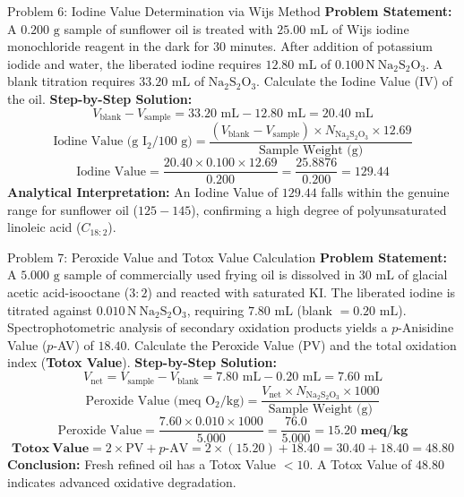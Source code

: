 \documentclass[11pt,a4paper,oneside]{article}
\begin{document}
\begin{examplebox}{Problem 6: Iodine Value Determination via Wijs Method}
\textbf{Problem Statement:}
A $0.200\text{ g}$ sample of sunflower oil is treated with $25.00\text{ mL}$ of Wijs iodine monochloride reagent in the dark for 30 minutes. After addition of potassium iodide and water, the liberated iodine requires $12.80\text{ mL}$ of $0.100\,\mathrm{N}\ \mathrm{Na_2S_2O_3}$. A blank titration requires $33.20\text{ mL}$ of $\mathrm{Na_2S_2O_3}$.
Calculate the Iodine Value (IV) of the oil.
\vspace{0.2cm}
\textbf{Step-by-Step Solution:}
$$V_{\text{blank}} - V_{\text{sample}} = 33.20\text{ mL} - 12.80\text{ mL} = 20.40\text{ mL}$$
$$\text{Iodine Value (g }\mathrm{I_2}\text{/100 g)} = \frac{(V_{\text{blank}} - V_{\text{sample}}) \times N_{\mathrm{Na_2S_2O_3}} \times 12.69}{\text{Sample Weight (g)}}$$
$$\text{Iodine Value} = \frac{20.40 \times 0.100 \times 12.69}{0.200} = \frac{25.8876}{0.200} = \mathbf{129.44}$$
\textbf{Analytical Interpretation:} An Iodine Value of $129.44$ falls within the genuine range for sunflower oil ($125-145$), confirming a high degree of polyunsaturated linoleic acid ($C_{18:2}$).
\end{examplebox}

\begin{examplebox}{Problem 7: Peroxide Value and Totox Value Calculation}
\textbf{Problem Statement:}
A $5.000\text{ g}$ sample of commercially used frying oil is dissolved in $30\text{ mL}$ of glacial acetic acid-isooctane ($3:2$) and reacted with saturated $\mathrm{KI}$. The liberated iodine is titrated against $0.010\,\mathrm{N}\ \mathrm{Na_2S_2O_3}$, requiring $7.80\text{ mL}$ (blank $= 0.20\text{ mL}$).
Spectrophotometric analysis of secondary oxidation products yields a $p$-Anisidine Value ($p$-AV) of $18.40$.
Calculate the Peroxide Value (PV) and the total oxidation index (\textbf{Totox Value}).
\vspace{0.2cm}
\textbf{Step-by-Step Solution:}
$$V_{\text{net}} = V_{\text{sample}} - V_{\text{blank}} = 7.80\text{ mL} - 0.20\text{ mL} = 7.60\text{ mL}$$
$$\text{Peroxide Value (meq }\mathrm{O_2}\text{/kg)} = \frac{V_{\text{net}} \times N_{\mathrm{Na_2S_2O_3}} \times 1000}{\text{Sample Weight (g)}}$$
$$\text{Peroxide Value} = \frac{7.60 \times 0.010 \times 1000}{5.000} = \frac{76.0}{5.000} = \mathbf{15.20\text{ meq/kg}}$$
$$\mathbf{Totox\ Value} = 2 \times \text{PV} + p\text{-AV} = 2 \times (15.20) + 18.40 = 30.40 + 18.40 = \mathbf{48.80}$$
\textbf{Conclusion:} Fresh refined oil has a Totox Value $<10$. A Totox Value of $\mathbf{48.80}$ indicates advanced oxidative degradation.
\end{examplebox}
\end{document}
